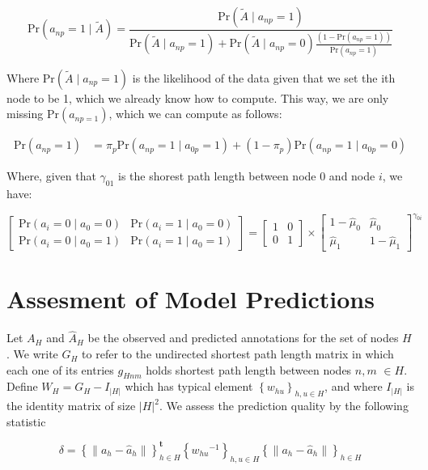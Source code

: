 \documentclass{article}
\renewcommand{\Pr}[1]{{\mbox{Pr}\left(#1\right) }}
\newcommand{\Prcond}[2]{{\mbox{Pr}\left(#1\;|\;#2\right) }}
\begin{document}
\begin{equation}
\tag{1'}
\Prcond{a_{np} = 1}{\tilde A} = \frac{\Prcond{\tilde A}{a_{np} = 1}}{
\Prcond{\tilde A}{a_{np} = 1} + \Prcond{\tilde A}{a_{np} = 0} \frac{\left(1 - \Pr{a_{np} = 1}\right)}{\Pr{a_{np} = 1}}
}
\end{equation}

Where $\Prcond{\tilde A}{a_{np} = 1}$ is the likelihood of the data given that we set the ith node to be 1, which we already know how to compute. This way, we are only missing $\Pr{a_{np=1}}$, which we can compute as follows:

\begin{align*}
\Pr{a_{np} = 1} & = \pi_p \Prcond{a_{np} = 1}{a_{0p} = 1} + (1 - \pi_p) \Prcond{a_{np} = 1}{a_{0p} = 0}
\end{align*}


Where, given that $\gamma_{01}$ is the shorest path length between node 0 and node $i$, we have:

$$
\left[\begin{array}{cc}
\Prcond{a_i = 0}{a_0 = 0} & \Prcond{a_i = 1}{a_0 = 0} \\
\Prcond{a_i = 0}{a_0 = 1} & \Prcond{a_i = 1}{a_0 = 1}
\end{array}
\right]
=
\left[\begin{array}{cc}
1 & 0 \\
0 & 1
\end{array} \right] \times
\left[\begin{array}{cc}
1 - \hat\mu_0 &  \hat\mu_0 \\
\hat\mu_1 &  1 - \hat\mu_1
\end{array}
\right]^{\gamma_{0i}}
$$


\section{Assesment of Model Predictions}

Let $A_H$ and $\hat A_H$ be the observed and predicted annotations for the set of nodes $H$. We write $G_H$ to refer to the undirected shortest path length matrix in which each one of its entries $g_{Hnm}$ holds shortest path length between nodes $n, m$ $\in H$. Define $W_H = G_H - I_{|H|}$ which has typical element $\left\{ {w_{hu}} \right\}_{h, u\in H}$, and where $I_{|H|}$ is the identity matrix of size $|H|^2$. We assess the prediction quality by the following statistic

\begin{equation}
\label{eq:delta1}
\delta = \left\{\left\| a_h - \hat a_h \right\|\right\}_{h \in H}^\mathbf{t}
\left\{ {w_{hu}}^{-1} \right\}_{h, u\in H}
\left\{\left\| a_h - \hat a_h \right\|\right\}_{h \in H}
\end{equation}
\end{document}
